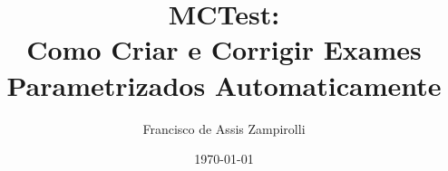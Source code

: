 
\frontmatter
\title{MCTest:\\
Como Criar e Corrigir Exames Parametrizados Automaticamente}
\author{Francisco de Assis Zampirolli}

\date{\today}


\maketitle
\cleardoublepage
\cleardoublepage
\cleardoublepage
\cleardoublepage
\frontmatter

\setcounter{page}{11}
\tableofcontents\cleardoublepage
\listoffigures\cleardoublepage
{}
\listoflistings
\cleardoublepage

\mainmatter





